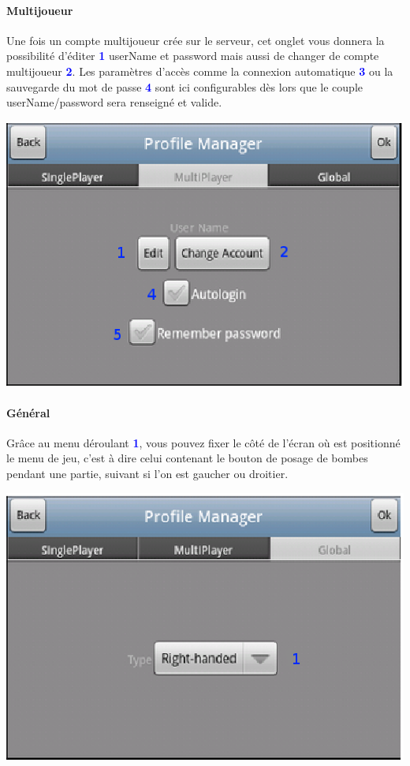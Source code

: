 		\paragraph{Multijoueur\\}
		Une fois un compte multijoueur crée sur le serveur, cet onglet vous donnera la
		possibilité d'éditer \textcolor{blue}{\textbf{1}} userName et password mais
		aussi de changer de compte multijoueur \textcolor{blue}{\textbf{2}}. Les
		paramètres d'accès comme la connexion automatique
		\textcolor{blue}{\textbf{3}} ou la sauvegarde du mot de passe
		\textcolor{blue}{\textbf{4}} sont ici configurables dès lors que le couple
		userName/password sera renseigné et valide.
		
		\begin{center}
				\includegraphics[scale=0.8]{Manuel/Img/6.eps}
		\end{center}
		
		\newpage{}	
		\paragraph{Général\\}
		Grâce au menu déroulant \textcolor{blue}{\textbf{1}}, vous pouvez fixer le
		côté de l'écran où est positionné le menu de jeu, c'est à dire celui contenant
		le bouton de posage de bombes pendant une partie, suivant si l'on est gaucher ou droitier. 
		
		\begin{center}
				\includegraphics[scale=0.8]{Manuel/Img/7.eps}
		\end{center}
			
